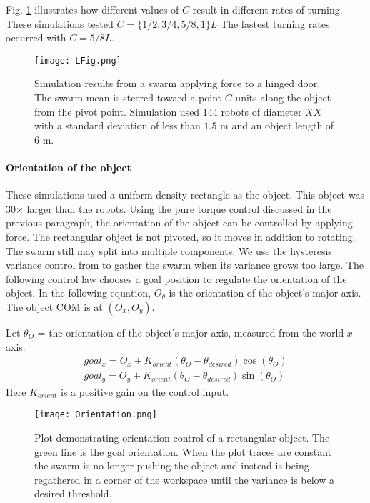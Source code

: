  Fig. \ref{fig:LFig} illustrates how different values of $C$ result in different rates of turning. These simulations tested $C = \{1/2, 3/4, 5/8, 1\}L$  The fastest turning rates occurred with  $C =  5/8L$. 



\begin{figure}
\begin{center}
	\texttt{[image: LFig.png]}
\end{center}
\vspace{-1em}
\caption{\label{fig:LFig}
Simulation results from a swarm applying force to a hinged door. 
The swarm mean is steered toward a point $C$ units along the object from the pivot point. 
 Simulation used 144 robots of diameter $XX$ with a standard deviation of less than $1.5$ m and an object length of $6$ m.
}
\vspace{-1em}
\end{figure}


\paragraph{Orientation of the object}
These simulations used a uniform density rectangle as the object. This object was 30$\times$ larger than the robots.
Using the pure torque control discussed in the previous paragraph, the orientation of the object can be controlled by applying force. 
The rectangular object is not pivoted, so it moves in addition to rotating. 
 The swarm still may split into multiple components.
  We use the hysteresis variance control from \cite{ShahrokhiIROS2015}  to gather the swarm when its variance grows too large. 
  The following control law chooses a goal position to regulate the orientation of the object.  In the following equation, $O_{\theta}$ is the orientation of the object's major axis. The object COM is at $(O_x,O_y)$.

Let $\theta_O$ = the orientation of the object's major axis, measured from the world $x$-axis.
\begin{align}\nonumber
goal_x = O_x +  K_{orient}  ( \theta_O - \theta_{desired} ) \cos(\theta_O) \\
goal_y = O_y +  K_{orient}  ( \theta_O - \theta_{desired} ) \sin(\theta_O)
\end{align}
Here $K_{orient}$ is a positive gain on the control input.  


\begin{figure}
\begin{center}
	\texttt{[image: Orientation.png]}
\end{center}
\vspace{-1em}
\caption{\label{fig:OrientCont}
Plot demonstrating  orientation control of a rectangular object. The green line is the goal orientation.   When the plot traces are constant the swarm is no longer pushing the object and instead is being regathered in a corner of the workspace until the variance is below a desired threshold. 
}
\vspace{-1em}
\end{figure}

